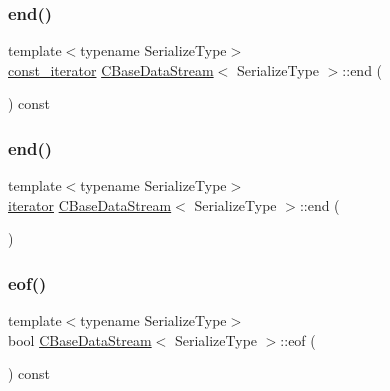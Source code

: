 \subsubsection{\texorpdfstring{end()}{end()}\hspace{0.1cm}{\footnotesize\ttfamily [1/2]}}
{\footnotesize\ttfamily template$<$typename Serialize\+Type$>$ \\
\mbox{\hyperlink{class_c_base_data_stream_a9cf3080c5a75c94568980a59d3aab3ad}{const\+\_\+iterator}} \mbox{\hyperlink{class_c_base_data_stream}{C\+Base\+Data\+Stream}}$<$ Serialize\+Type $>$\+::end (\begin{DoxyParamCaption}{ }\end{DoxyParamCaption}) const\hspace{0.3cm}{\ttfamily [inline]}}

\mbox{\label{class_c_base_data_stream_ac511b088f239c8e086322d50bcc762fe}} 
\subsubsection{\texorpdfstring{end()}{end()}\hspace{0.1cm}{\footnotesize\ttfamily [2/2]}}
{\footnotesize\ttfamily template$<$typename Serialize\+Type$>$ \\
\mbox{\hyperlink{class_c_base_data_stream_a23e0e0af1c68dd36c27162036b6d048d}{iterator}} \mbox{\hyperlink{class_c_base_data_stream}{C\+Base\+Data\+Stream}}$<$ Serialize\+Type $>$\+::end (\begin{DoxyParamCaption}{ }\end{DoxyParamCaption})\hspace{0.3cm}{\ttfamily [inline]}}

\mbox{\label{class_c_base_data_stream_a6501eb90892ec457cd99d48e5e658cfd}} 
\subsubsection{\texorpdfstring{eof()}{eof()}}
{\footnotesize\ttfamily template$<$typename Serialize\+Type$>$ \\
bool \mbox{\hyperlink{class_c_base_data_stream}{C\+Base\+Data\+Stream}}$<$ Serialize\+Type $>$\+::eof (\begin{DoxyParamCaption}{ }\end{DoxyParamCaption}) const\hspace{0.3cm}{\ttfamily [inline]}}

